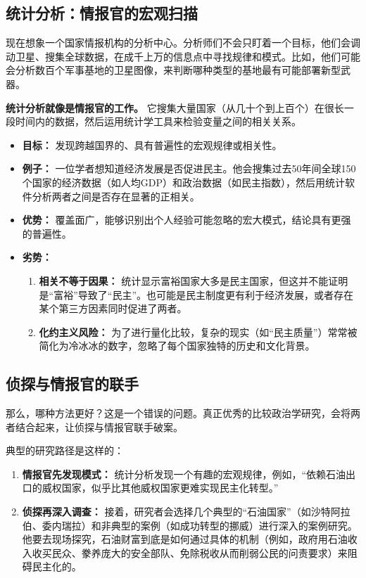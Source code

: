 \documentclass[a5paper, 11pt, openany]{ctexbook}
\begin{document}
\subsection{统计分析：情报官的宏观扫描}

现在想象一个国家情报机构的分析中心。分析师们不会只盯着一个目标，他们会调动卫星、搜集全球数据，在成千上万的信息点中寻找规律和模式。比如，他们可能会分析数百个军事基地的卫星图像，来判断哪种类型的基地最有可能部署新型武器。

\textbf{统计分析就像是情报官的工作。} 它搜集大量国家（从几十个到上百个）在很长一段时间内的数据，然后运用统计学工具来检验变量之间的相关关系。

\begin{itemize}
    \item \textbf{目标：} 发现跨越国界的、具有普遍性的宏观规律或相关性。
    \item \textbf{例子：} 一位学者想知道经济发展是否促进民主。他会搜集过去50年间全球150个国家的经济数据（如人均GDP）和政治数据（如民主指数），然后用统计软件分析两者之间是否存在显著的正相关。
    \item \textbf{优势：} 覆盖面广，能够识别出个人经验可能忽略的宏大模式，结论具有更强的普遍性。
    \item \textbf{劣势：}
    \begin{enumerate}
        \item \textbf{相关不等于因果：} 统计显示富裕国家大多是民主国家，但这并不能证明是“富裕”导致了“民主”。也可能是民主制度更有利于经济发展，或者存在某个第三方因素同时促进了两者。
        \item \textbf{化约主义风险：} 为了进行量化比较，复杂的现实（如“民主质量”）常常被简化为冷冰冰的数字，忽略了每个国家独特的历史和文化背景。
    \end{enumerate}
\end{itemize}

\subsection{侦探与情报官的联手}

那么，哪种方法更好？这是一个错误的问题。真正优秀的比较政治学研究，会将两者结合起来，让侦探与情报官联手破案。

典型的研究路径是这样的：
\begin{enumerate}
    \item \textbf{情报官先发现模式：} 统计分析发现一个有趣的宏观规律，例如，“依赖石油出口的威权国家，似乎比其他威权国家更难实现民主化转型。”
    \item \textbf{侦探再深入调查：} 接着，研究者会选择几个典型的“石油国家”（如沙特阿拉伯、委内瑞拉）和非典型的案例（如成功转型的挪威）进行深入的案例研究。他要去现场探究，石油财富到底是如何通过具体的机制（例如，政府用石油收入收买民众、豢养庞大的安全部队、免除税收从而削弱公民的问责要求）来阻碍民主化的。
\end{enumerate}
\end{document}
